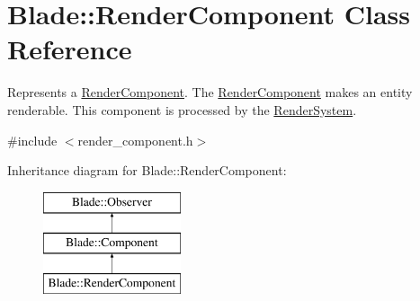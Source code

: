 \hypertarget{class_blade_1_1_render_component}{}\section{Blade\+:\+:Render\+Component Class Reference}
\label{class_blade_1_1_render_component}


Represents a \hyperlink{class_blade_1_1_render_component}{Render\+Component}. The \hyperlink{class_blade_1_1_render_component}{Render\+Component} makes an entity renderable. This component is processed by the \hyperlink{class_blade_1_1_render_system}{Render\+System}.  




{\ttfamily \#include $<$render\+\_\+component.\+h$>$}

Inheritance diagram for Blade\+:\+:Render\+Component\+:\begin{figure}[H]
\begin{center}
\leavevmode
\includegraphics[height=3.000000cm]{class_blade_1_1_render_component}
\end{center}
\end{figure}
